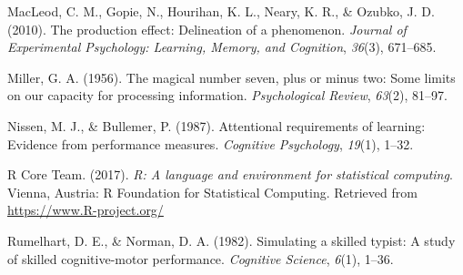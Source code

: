 \documentclass[,man,floatsintext]{apa6}
\begin{document}
\leavevmode\hypertarget{ref-MacLeodproductioneffectDelineation2010}{}%
MacLeod, C. M., Gopie, N., Hourihan, K. L., Neary, K. R., \& Ozubko, J. D. (2010). The production effect: Delineation of a phenomenon. \emph{Journal of Experimental Psychology: Learning, Memory, and Cognition}, \emph{36}(3), 671--685.

\leavevmode\hypertarget{ref-Millermagicalnumberseven1956}{}%
Miller, G. A. (1956). The magical number seven, plus or minus two: Some limits on our capacity for processing information. \emph{Psychological Review}, \emph{63}(2), 81--97.

\leavevmode\hypertarget{ref-NissenAttentionalrequirementslearning1987}{}%
Nissen, M. J., \& Bullemer, P. (1987). Attentional requirements of learning: Evidence from performance measures. \emph{Cognitive Psychology}, \emph{19}(1), 1--32.

\leavevmode\hypertarget{ref-R-base}{}%
R Core Team. (2017). \emph{R: A language and environment for statistical computing}. Vienna, Austria: R Foundation for Statistical Computing. Retrieved from \url{https://www.R-project.org/}

\leavevmode\hypertarget{ref-RumelhartSimulatingskilledtypist1982}{}%
Rumelhart, D. E., \& Norman, D. A. (1982). Simulating a skilled typist: A study of skilled cognitive-motor performance. \emph{Cognitive Science}, \emph{6}(1), 1--36.

\endgroup
\end{document}
